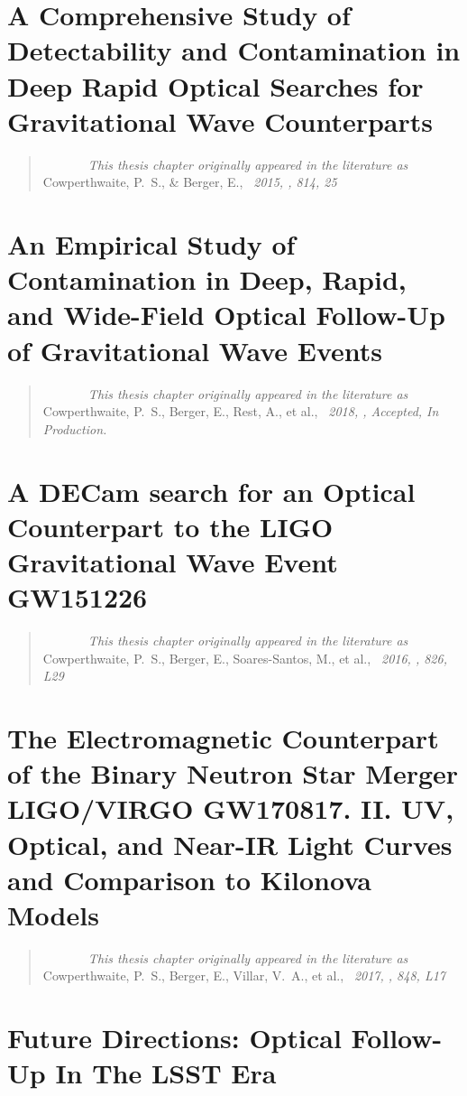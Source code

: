 \documentclass[bound]{hvdthesis}
\begin{document}
\chapter{A Comprehensive Study of Detectability and Contamination in Deep Rapid Optical Searches for Gravitational Wave Counterparts}\label{ch:ch2}
\begin{quote}
{\em ~~~~~~~This thesis chapter originally appeared in the literature as} \\
{Cowperthwaite, P.~S., \& Berger, E.,
{\em \ 2015, \apj, 814, 25}}
\end{quote}

\clearpage
%
\chapter{An Empirical Study of Contamination in Deep, Rapid, and Wide-Field Optical Follow-Up of Gravitational Wave Events}\label{ch:ch3}
\begin{quote}
{\em ~~~~~~~This thesis chapter originally appeared in the literature as} \\
{Cowperthwaite, P.~S., Berger, E., Rest, A., et al.,
{\em \ 2018, \apj, Accepted, In Production.}}
\end{quote}

\clearpage
%
\chapter{A DECam search for an Optical Counterpart to the LIGO Gravitational Wave Event GW151226}\label{ch:ch4}
\begin{quote}
{\em ~~~~~~~This thesis chapter originally appeared in the literature as} \\
{Cowperthwaite, P.~S., Berger, E., Soares-Santos, M., et al.,
{\em\ 2016, \apjl, 826, L29}}
\end{quote}

\clearpage
%
\chapter{The Electromagnetic Counterpart of the Binary Neutron Star Merger LIGO/VIRGO GW170817. II. UV, Optical, and Near-IR Light Curves and Comparison to Kilonova Models}\label{ch:ch5}
\begin{quote}
{\em ~~~~~~~This thesis chapter originally appeared in the literature as} \\
{Cowperthwaite, P.~S., Berger, E., Villar, V.~A., et al.,
{\em \ 2017, \apjl, 848, L17}}
\end{quote}

\clearpage
%
\chapter{Future Directions: Optical Follow-Up In The LSST Era}\label{ch:ch6}


\singlespace


\end{document}
